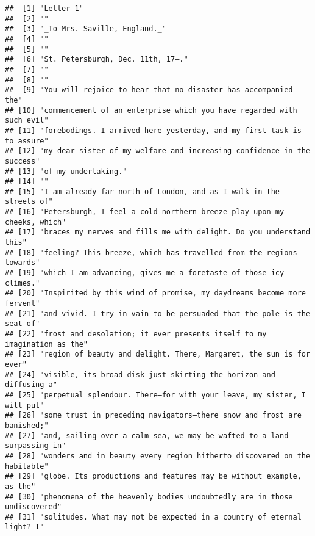 \documentclass[t]{beamer}\usepackage[]{graphicx}\usepackage[]{color}
\makeatletter
\newenvironment{kframe}{%
 \def\at@end@of@kframe{}%
 \ifinner\ifhmode%
  \def\at@end@of@kframe{\end{minipage}}%
  \begin{minipage}{\columnwidth}%
 \fi\fi%
 \def\FrameCommand##1{\hskip\@totalleftmargin \hskip-\fboxsep
 \colorbox{shadecolor}{##1}\hskip-\fboxsep
     \hskip-\linewidth \hskip-\@totalleftmargin \hskip\columnwidth}%
 \MakeFramed {\advance\hsize-\width
   \@totalleftmargin\z@ \linewidth\hsize
   \@setminipage}}%
 {\par\unskip\endMakeFramed%
 \at@end@of@kframe}
\newenvironment{knitrout}{}{} %
\makeatother
\begin{document}
\begin{frame}[fragile]
\tiny
\begin{knitrout}
\color{fgcolor}\begin{kframe}
\begin{verbatim}
##  [1] "Letter 1"                                                               
##  [2] ""                                                                       
##  [3] "_To Mrs. Saville, England._"                                            
##  [4] ""                                                                       
##  [5] ""                                                                       
##  [6] "St. Petersburgh, Dec. 11th, 17—."                                       
##  [7] ""                                                                       
##  [8] ""                                                                       
##  [9] "You will rejoice to hear that no disaster has accompanied the"          
## [10] "commencement of an enterprise which you have regarded with such evil"   
## [11] "forebodings. I arrived here yesterday, and my first task is to assure"  
## [12] "my dear sister of my welfare and increasing confidence in the success"  
## [13] "of my undertaking."                                                     
## [14] ""                                                                       
## [15] "I am already far north of London, and as I walk in the streets of"      
## [16] "Petersburgh, I feel a cold northern breeze play upon my cheeks, which"  
## [17] "braces my nerves and fills me with delight. Do you understand this"     
## [18] "feeling? This breeze, which has travelled from the regions towards"     
## [19] "which I am advancing, gives me a foretaste of those icy climes."        
## [20] "Inspirited by this wind of promise, my daydreams become more fervent"   
## [21] "and vivid. I try in vain to be persuaded that the pole is the seat of"  
## [22] "frost and desolation; it ever presents itself to my imagination as the" 
## [23] "region of beauty and delight. There, Margaret, the sun is for ever"     
## [24] "visible, its broad disk just skirting the horizon and diffusing a"      
## [25] "perpetual splendour. There—for with your leave, my sister, I will put"  
## [26] "some trust in preceding navigators—there snow and frost are banished;"  
## [27] "and, sailing over a calm sea, we may be wafted to a land surpassing in" 
## [28] "wonders and in beauty every region hitherto discovered on the habitable"
## [29] "globe. Its productions and features may be without example, as the"     
## [30] "phenomena of the heavenly bodies undoubtedly are in those undiscovered" 
## [31] "solitudes. What may not be expected in a country of eternal light? I"
\end{verbatim}
\end{kframe}
\end{knitrout}
\end{frame}
\end{document}
